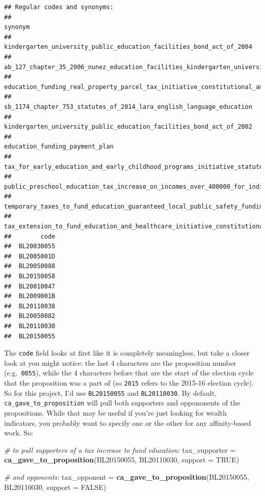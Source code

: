 \documentclass[]{book}
\newenvironment{Shaded}{\begin{snugshade}}{\end{snugshade}}
\newcommand{\CommentTok}[1]{\textcolor[rgb]{0.56,0.35,0.01}{\textit{#1}}}
\newcommand{\DataTypeTok}[1]{\textcolor[rgb]{0.13,0.29,0.53}{#1}}
\newcommand{\KeywordTok}[1]{\textcolor[rgb]{0.13,0.29,0.53}{\textbf{#1}}}
\newcommand{\NormalTok}[1]{#1}
\newcommand{\OtherTok}[1]{\textcolor[rgb]{0.56,0.35,0.01}{#1}}
\newcommand{\StringTok}[1]{\textcolor[rgb]{0.31,0.60,0.02}{#1}}
\begin{document}
\begin{verbatim}
## Regular codes and synonyms:
##                                                                                   synonym
##                      kindergarten_university_public_education_facilities_bond_act_of_2004
##      ab_127_chapter_35_2006_nunez_education_facilities_kindergarten_university_public_edu
##  education_funding_real_property_parcel_tax_initiative_constitutional_amendment_and_statu
##                      sb_1174_chapter_753_statutes_of_2014_lara_english_language_education
##                      kindergarten_university_public_education_facilities_bond_act_of_2002
##                                                            education_funding_payment_plan
##                   tax_for_early_education_and_early_childhood_programs_initiative_statute
##      public_preschool_education_tax_increase_on_incomes_over_400000_for_individuals_80000
##          temporary_taxes_to_fund_education_guaranteed_local_public_safety_funding_initiat
##         tax_extension_to_fund_education_and_healthcare_initiative_constitutional_amendmen
##        code
##  BL20030055
##  BL2005001D
##  BL20050088
##  BL20150058
##  BL20010047
##  BL2009001B
##  BL20110038
##  BL20050082
##  BL20110030
##  BL20150055
\end{verbatim}

The \texttt{code} field looks at first like it is completely meaningless, but take a closer look at you might notice: the last 4 characters are the proposition number (e.g.~\texttt{0055}), while the 4 characters before that are the start of the election cycle that the proposition was a part of (so \texttt{2015} refers to the 2015-16 election cycle). So for this project, I'd use \texttt{BL20150055} and \texttt{BL20110030}. By default, \texttt{ca\_gave\_to\_proposition} will pull both supporters and oppononents of the propositions. While that may be useful if you're just looking for wealth indicators, you probably want to specify one or the other for any affinity-based work. So:

\begin{Shaded}
\begin{Highlighting}[]
\CommentTok{# to pull supporters of a tax increase to fund education:}
\NormalTok{tax_supporter =}\StringTok{ }\KeywordTok{ca_gave_to_proposition}\NormalTok{(BL20150055, BL20110030, }
                                       \DataTypeTok{support =} \OtherTok{TRUE}\NormalTok{)}

\CommentTok{# and opponents:}
\NormalTok{tax_opponent =}\StringTok{ }\KeywordTok{ca_gave_to_proposition}\NormalTok{(BL20150055, BL20110030, }
                                      \DataTypeTok{support =} \OtherTok{FALSE}\NormalTok{)}
\end{Highlighting}
\end{Shaded}
\end{document}
